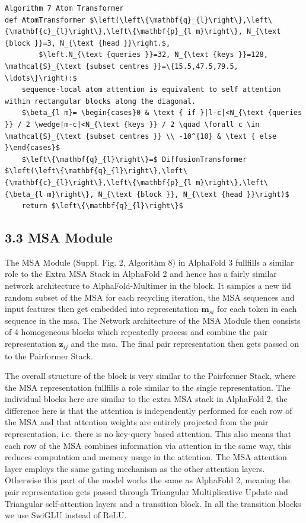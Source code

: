 \documentclass[10pt]{article}
\begin{document}
\begin{verbatim}
Algorithm 7 Atom Transformer
def AtomTransformer $\left(\left\{\mathbf{q}_{l}\right\},\left\{\mathbf{c}_{l}\right\},\left\{\mathbf{p}_{l m}\right\}, N_{\text {block }}=3, N_{\text {head }}\right.$,
        $\left.N_{\text {queries }}=32, N_{\text {keys }}=128, \mathcal{S}_{\text {subset centres }}=\{15.5,47.5,79.5, \ldots\}\right):$
    sequence-local atom attention is equivalent to self attention within rectangular blocks along the diagonal.
    $\beta_{l m}= \begin{cases}0 & \text { if }|l-c|<N_{\text {queries }} / 2 \wedge|m-c|<N_{\text {keys }} / 2 \quad \forall c \in \mathcal{S}_{\text {subset centres }} \\ -10^{10} & \text { else }\end{cases}$
    $\left\{\mathbf{q}_{l}\right\}=$ DiffusionTransformer $\left(\left\{\mathbf{q}_{l}\right\},\left\{\mathbf{c}_{l}\right\},\left\{\mathbf{p}_{l m}\right\},\left\{\beta_{l m}\right\}, N_{\text {block }}, N_{\text {head }}\right)$
    return $\left\{\mathbf{q}_{l}\right\}$
\end{verbatim}

\subsection*{3.3 MSA Module}
The MSA Module (Suppl. Fig. 2, Algorithm 8) in AlphaFold 3 fullfills a similar role to the Extra MSA Stack in AlphaFold 2 and hence has a fairly similar network architecture to AlphaFold-Multimer in the block. It samples a new iid random subset of the MSA for each recycling iteration, the MSA sequences and input features then get embedded into representation $\mathbf{m}_{s i}$ for each token in each sequence in the msa. The Network architecture of the MSA Module then consists of 4 homogeneous blocks which repeatedly process and combine the pair representation $\mathbf{z}_{i j}$ and the msa. The final pair representation then gets passed on to the Pairformer Stack.

The overall structure of the block is very similar to the Pairformer Stack, where the MSA representation fullfills a role similar to the single representation. The individual blocks here are similar to the extra MSA stack in AlphaFold 2, the difference here is that the attention is independently performed for each row of the MSA and that attention weights are entirely projected from the pair representation, i.e. there is no key-query based attention. This also means that each row of the MSA combines information via attention in the same way, this reduces computation and memory usage in the attention. The MSA attention layer employs the same gating mechanism as the other attention layers. Otherwise this part of the model works the same as AlphaFold 2, meaning the pair representation gets passed through Triangular Multiplicative Update and Triangular self-attention layers and a transition block. In all the transition blocks we use SwiGLU instead of ReLU.
\end{document}
